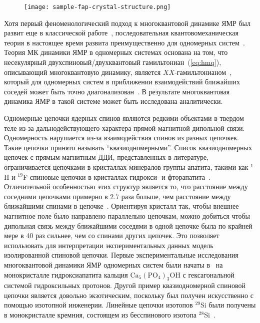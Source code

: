 \begin{figure}[ht]
  \texttt{[image: sample-fap-crystal-structure.png]}
  \caption{\protect}
  \label{fig:sample-fap-crystal-structure}
\end{figure}
Хотя первый феноменологический подход к многоквантовой динамике ЯМР был развит еще в классической работе~\cite{Baum1985},
последовательная квантовомеханическая теория в настоящее время развита преимущественно для одномерных систем~\cite{Feldman1996, Feldman1997, Doronin2000, Feldman2014}.
Теория МК динамики ЯМР в одномерных системах основана на том,
что несекулярный двухспиновый/двухквантовый гамильтониан~(\ref{eq:hmq}),
описывающий многоквантовую динамику,
является $XX$-гамильтонианом~\cite{Landau5},
который для одномерных систем в приближении взаимодействий ближайших соседей может быть точно диагонализован~\cite{Mattis1993}.
В результате многоквантовая динамика ЯМР в такой системе может быть исследована аналитически.

Одномерные цепочки ядерных спинов являются редкими объектами в твердом теле из-за дальнодействующего характера прямой магнитной дипольной связи.
Одномерность нарушается из-за взаимодействия спинов из разных цепочкек.
Такие цепочки принято называть ``квазиодномерными''.
Список квазиодномерных цепочек с прямым магнитным ДДИ,
представленных в литературе,
ограничивается цепочками в кристаллах минералов группы апатита,
такими как $^{1}$H и $^{19}$F спиновые цепочки в кристаллах гидрокси- и фторапатита~\cite{Cho1996}.
Отличительной особенностью этих структур является то,
что расстояние между соседними цепочками примерно в $2.7$ раза больше,
чем расстояние между ближайшими спинами в цепочке~\cite{Cho1996}.
Ориентируя кристалл так,
чтобы внешнее магнитное поле было направлено параллельно цепочкам,
можно добиться чтобы дипольная связь между ближайшими соседями в одной цепочке была по крайней мере в 40 раз сильнее,
чем со спинами других цепочек.
Это позволяет использовать для интерпретации экспериментальных данных модель изолированной спиновой цепочки.
Первые экспериментальные исследования многоквантовой динамики ЯМР одномерных систем были начаты в~\cite{Cho1996, Gatta2012} на монокристалле гидроксиапатита кальция $\mathrm{Ca}_5(\mathrm{PO}_4)_3\mathrm{OH}$ с гексагональной системой гидроксильных протонов.
Другой пример квазиодномерной спиновой цепочки является довольно экзотическим,
поскольку был получен искусственно с помощью изотопной инженерии.
Линейные цепочки изотопов $^{29}$Si были получены в монокристалле кремния, состоящем из бесспинового изотопа $^{28}$Si~\cite{Itoh2005}.

